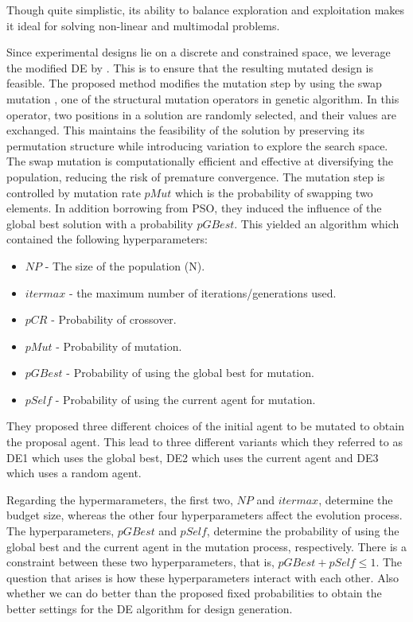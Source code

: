 \documentclass [PhD] {package/uclathes}
\begin{document}
Though quite simplistic, its ability to balance exploration and exploitation makes it ideal for solving non-linear and multimodal problems. 

Since experimental designs lie on a discrete and constrained space, we leverage the modified DE by \textcite{stokes2023metaheuristic}. This is to ensure that the resulting mutated design is feasible. The proposed method modifies the mutation step by using the swap mutation  \parencite{michalewicz2013genetic}, one of the structural mutation operators in genetic algorithm.  In this operator, two positions in a solution are randomly selected, and their values are exchanged. This maintains the feasibility of the solution by preserving its permutation structure while introducing variation to explore the search space. The swap mutation is computationally efficient and effective at diversifying the population, reducing the risk of premature convergence. The mutation step is controlled by mutation rate $pMut$ which is the probability of swapping two elements. In addition borrowing from PSO, they induced the influence of the global best solution with a probability $pGBest$. This yielded an algorithm which contained the following hyperparameters:
\begin{itemize}
    \item $NP$ - The size of the population (N). %
    \item $itermax$ -  the maximum number of iterations/generations used. %
    \item $pCR$ - Probability of crossover. %
    \item $pMut$ - Probability of mutation. %
    \item $pGBest$ - Probability of using the global best for mutation.
    \item $pSelf$ - Probability of using the current agent for mutation.
\end{itemize}

They proposed three different choices of the initial agent to be mutated to obtain the proposal agent. This lead to three different variants which they referred to as DE1 which uses the global best, DE2 which uses the current agent and DE3 which uses a random agent.  

Regarding the hypermarameters, the first two, $NP$ and $itermax$, determine the budget size, whereas the other four hyperparameters affect the evolution process. The hyperparameters, $pGBest$ and $pSelf$, determine the probability of using the global best and the current agent in the mutation process, respectively. There is a constraint between these two hyperparameters, that is, $pGBest + pSelf \le 1$. The question that arises is how these hyperparameters interact with each other. Also whether we can do better than the proposed fixed probabilities to obtain the better settings for the DE algorithm for design generation.
\end{document}

